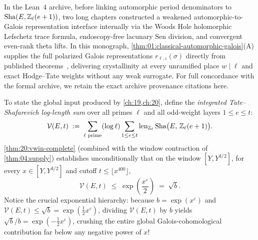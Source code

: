 \begin{remark}
In the Lean~4 archive, before linking automorphic period denominators to $\mathrm{Sha}(E, \mathbb{Z}_\ell(e+1))$, two long chapters constructed a weakened automorphic-to-Galois representation interface internally via the Woods Hole holomorphic Lefschetz trace formula, endoscopy-free lacunary Sen division, and convergent even-rank theta lifts. In this monograph, \cref{thm:01:classical-automorphic-galois}(A) supplies the full polarized Galois representations $r_{\ell, \iota}(\sigma)$ directly from published theorems~\cite{BLGGT2014,Shin2011,ChenevierHarris2013,Caraiani2012,Caraiani2014,Labesse2011,MoeglinWaldspurger1989}, delivering crystallinity at every unramified place $w \mid \ell$ and exact Hodge--Tate weights without any weak surrogate. For full concordance with the formal archive, we retain the exact archive provenance citations here.
\end{remark}

To state the global input produced by \cref{ch:19,ch:20}, define the \emph{integrated Tate--Shafarevich log-length sum} over all primes $\ell$ and all odd-weight layers $1 \le e \le t$:
\begin{equation}
\label{eq:18:V-func}
  \mathcal{V}(E, t) \;:=\; \sum_{\ell \text{ prime}} (\log\ell) \sum_{1 \le e \le t} \operatorname{len}_{\mathbb{Z}_\ell}\mathrm{Sha}\bigl(E,\, \mathbb{Z}_\ell(e+1)\bigr).
\end{equation}
\cref{thm:20:vwin-complete} (combined with the window contraction of \cref{thm:04:supply}) establishes unconditionally that on the window $[Y, Y^{3/2}]$, for every $x \in [Y, Y^{3/2}]$ and cutoff $t \le \lfloor x^{400} \rfloor$,
\begin{equation}
\label{eq:18:vwin-target}
  \mathcal{V}(E, t) \;\le\; \exp\!\left(\frac{x^\varepsilon}{2}\right) \;=\; \sqrt{b}.
\end{equation}
Notice the crucial exponential hierarchy: because $b = \exp(x^\varepsilon)$ and $\mathcal{V}(E, t) \le \sqrt{b} = \exp(\frac{1}{2}x^\varepsilon)$, dividing $\mathcal{V}(E, t)$ by $b$ yields $\sqrt{b}/b = \exp(-\frac{1}{2}x^\varepsilon)$, crushing the entire global Galois-cohomological contribution far below any negative power of $x$!


